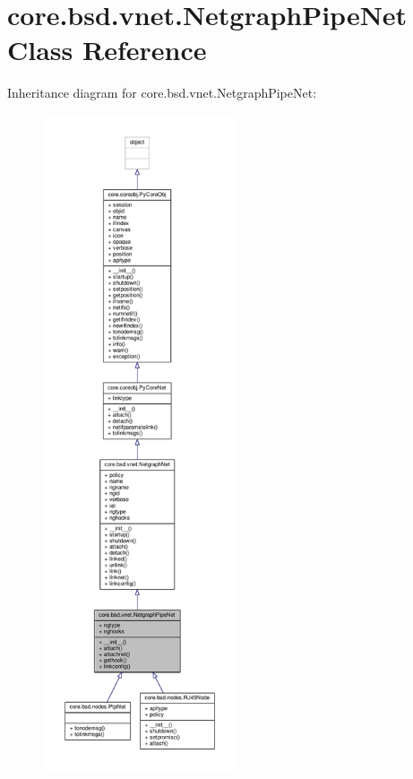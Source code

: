 \hypertarget{classcore_1_1bsd_1_1vnet_1_1_netgraph_pipe_net}{\section{core.\+bsd.\+vnet.\+Netgraph\+Pipe\+Net Class Reference}
\label{classcore_1_1bsd_1_1vnet_1_1_netgraph_pipe_net}
}


Inheritance diagram for core.\+bsd.\+vnet.\+Netgraph\+Pipe\+Net\+:
\nopagebreak
\begin{figure}[H]
\begin{center}
\leavevmode
\includegraphics[height=550pt]{classcore_1_1bsd_1_1vnet_1_1_netgraph_pipe_net__inherit__graph}
\end{center}
\end{figure}


